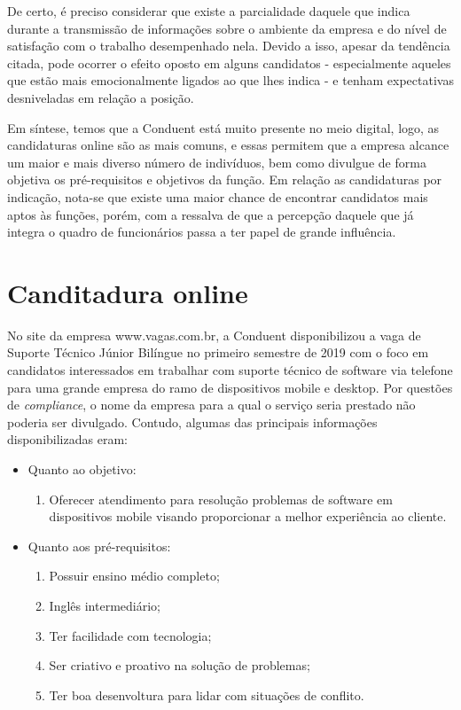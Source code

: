 \documentclass[12pt]{article}
\begin{document}
De certo, é preciso considerar que existe a parcialidade daquele que indica durante a transmissão de informações sobre o ambiente da empresa e do nível de satisfação com o trabalho desempenhado nela. Devido a isso, apesar da tendência citada, pode ocorrer o efeito oposto em alguns candidatos - especialmente aqueles que estão mais emocionalmente ligados ao que lhes indica - e tenham expectativas desniveladas em relação a posição.

Em síntese, temos que a Conduent está muito presente no meio digital, logo, as candidaturas online são as mais comuns, e essas permitem que a empresa alcance um maior e mais diverso número de indivíduos, bem como divulgue de forma objetiva os pré-requisitos e objetivos da função. Em relação as candidaturas por indicação, nota-se que existe uma maior chance de encontrar candidatos mais aptos às funções, porém, com a ressalva de que a percepção daquele que já integra o quadro de funcionários passa a ter papel de grande influência.  
 
\section {Canditadura online}
 
No site da empresa www.vagas.com.br, a Conduent disponibilizou a vaga de Suporte Técnico Júnior Bilíngue no primeiro semestre de 2019 com o foco em candidatos interessados em trabalhar com suporte técnico de software via telefone para uma grande empresa do ramo de dispositivos mobile e desktop. Por questões de  \emph {compliance}, o nome da empresa para a qual o serviço seria prestado não poderia ser divulgado. Contudo, algumas das principais informações disponibilizadas eram: 
 
 \newpage
 
  \begin{itemize}
\item Quanto ao objetivo:
	\begin{enumerate}
	\item Oferecer atendimento para resolução problemas de software em dispositivos mobile 	visando proporcionar a melhor experiência ao cliente.
	\end{enumerate}
\end{itemize}


 \begin{itemize}
\item Quanto aos pré-requisitos:
	\begin{enumerate}
   	\item Possuir ensino médio completo;
	\item Inglês intermediário;
   	\item Ter facilidade com tecnologia; 
   	\item Ser criativo e proativo na solução de problemas; 
   	\item Ter boa desenvoltura para lidar com situações de conflito. 
	\end{enumerate}
\end{itemize}
\end{document}
